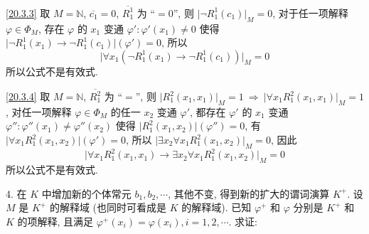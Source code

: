 \documentclass[boxes]{homework}
\begin{document}
\begin{solution}
    \ref{20.3.3} 取 $M = \mathbb{N}$, $\overline{c_1} = 0$, $\overline{R_1^1}$ 为 ``$=0$'', 则 $\lvert\lnot R_1^1(c_1)\rvert_M = 0$,  对于任一项解释 $\varphi\in\Phi_M$, 存在 $\varphi$ 的 $x_1$ 变通 $\varphi' : \varphi'(x_1)\neq 0$ 使得 $\lvert\lnot R_1^1(x_1)\to \lnot R_1^1(c_1)\rvert(\varphi') = 0$, 所以
    $$
        \lvert\forall x_1 (\lnot R_1^1(x_1)\to \lnot R_1^1(c_1))\rvert_M = 0
    $$
    所以公式不是有效式.

    \ref{20.3.4} 取 $M = \mathbb{N}$, $\overline{R_1^2}$ 为 ``$=$'', 则 $\lvert R_1^2(x_1, x_1)\rvert_M = 1\ \Rightarrow\ \lvert\forall x_1 R_1^2(x_1, x_1)\rvert_M = 1$, 对任一项解释 $\varphi\in\Phi_M$ 的任一 $x_2$ 变通 $\varphi'$, 都存在 $\varphi'$ 的 $x_1$ 变通 $\varphi'': \varphi''(x_1)\neq\varphi''(x_2)$ 使得 $\lvert R_1^2(x_1, x_2)\rvert(\varphi'') = 0$, 有 $\lvert\forall x_1 R_1^2(x_1, x_2)\rvert(\varphi') = 0$, 所以 $\lvert\exists x_2\forall x_1 R_1^2(x_1, x_2)\rvert_M = 0$, 因此
    $$
        \lvert\forall x_1 R_1^2(x_1, x_1)\to \exists x_2 \forall x_1 R_1^2(x_1, x_2)\rvert_M = 0
    $$
    所以公式不是有效式.
\end{solution}

\begin{problem}
4. 在 $K$ 中增加新的个体常元 $b_1, b_2, \cdots$, 其他不变, 得到新的扩大的谓词演算 $K^+$. 设 $M$ 是 $K^+$ 的解释域 (也同时可看成是 $K$ 的解释域). 已知 $\varphi^+$ 和 $\varphi$ 分别是 $K^+$ 和 $K$ 的项解释, 且满足 $\varphi^+(x_i)=\varphi(x_i), i = 1, 2, \cdots$. 求证:
\end{problem}
\end{document}
